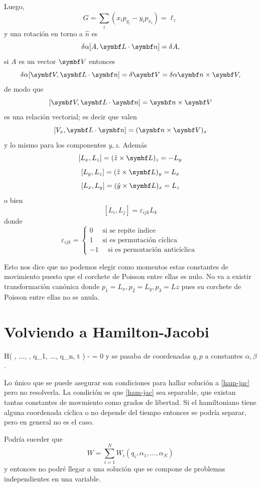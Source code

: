 \documentclass[10pt,oneside]{CBFT_book}
\begin{document}
Luego,
\[
	G = \sum_i ( x_i p_{y_i} - y_i p_{x_i} ) = \ell_z
\]
y una rotación en torno a $\hat{n}$ es
\[
	\delta\alpha [ A, \vb{L}\cdot\vb{n} ] = \delta A,
\]
si $A$ es un vector $\vb{V}$ entonces
\[
	\delta\alpha [ \vb{V}, \vb{L}\cdot\vb{n} ] = \delta \vb{V} = \delta\alpha \vb{n} \times \vb{V},
\]
de modo que 
\[
	[ \vb{V}, \vb{L}\cdot\vb{n} ] = \vb{n} \times \vb{V}
\]
es una relación vectorial; es decir que valen
\[
	[ V_x, \vb{L}\cdot\vb{n} ] = (\vb{n} \times \vb{V})_x
\]
y lo mismo para los componentes $y,z$. Además
\[
	[L_x, L_z] = ( \hat{z} \times \vb{L} )_z = - L_y
\]
\[
	[L_y, L_z] = ( \hat{z} \times \vb{L} )_y = L_x
\]
\[
	[L_x, L_y] = ( \hat{y} \times \vb{L} )_x = L_z
\]
o bien 
\[
	[L_i, L_j] = \varepsilon_{ijk} L_k
\]
donde 
\[
	\varepsilon_{ijk} = \begin{cases}
	 0 \quad \text{ si se repite índice } \\
	 1 \quad \text{ si es permutación cíclica } \\
	 -1 \quad \text{ si es permutación anticíclica }
	\end{cases}
\]

Esto nos dice que no podemos elegir como momentos estas constantes de movimiento puesto que el
corchete de Poisson entre ellas es nulo.
No va a existir transformación canónica donde $p_1 = L_x, p_2 = L_y, p_3 = Lz$ pues su corchete de
Poisson entre ellas no se anula.

\section{Volviendo a Hamilton-Jacobi}

\be
	H\left( , ..., , q_1, ..., q_n, t \right) -  = 0
	\label{ham-jac}
\ee
y se pasaba de coordenadas $q,p$ a constantes $\alpha,\beta$.

Lo único que se puede asegurar son condiciones para hallar solución a \eqref{ham-jac} pero no resolverla.
La condición es que \eqref{ham-jac} sea separable, que existan tantas constantes de movmiento como grados
de libertad. Si el hamiltoniano tiene alguna coordenada cíclica o no depende del tiempo entonces se podría
separar, pero en general no es el caso.

Podría suceder que
\[
	W = \sum_{i=1}^N W_i(q_i,\alpha_1,...,\alpha_N)
\]
y entonces no podré llegar a una solución que se compone de problemas independientes en una variable.
\end{document}
